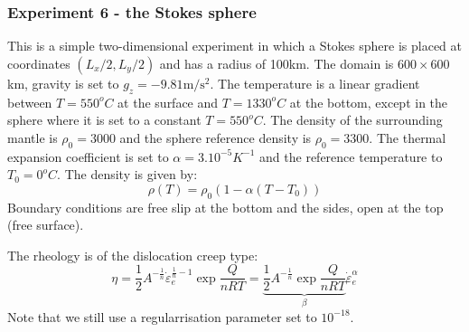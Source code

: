 \newpage
\subsubsection*{Experiment 6 - the Stokes sphere}

This is a simple two-dimensional experiment in which a Stokes sphere is placed at coordinates 
$(L_x/2,L_y/2)$ and has a radius of 100\si{\kilo\metre}. 
The domain is $600\times600$\si{\kilo\metre}, 
gravity is set to $g_z=-9.81\si{\metre\per\square\second}$.
The temperature is a linear gradient between  $T=550^oC$ at the surface and $T=1330^oC$ at the bottom,
except in the sphere where it is set to a constant $T=550^oC$.
The density of the surrounding mantle is $\rho_0=3000$ and the sphere reference density 
is $\rho_0=3300$. The thermal expansion 
coefficient is set to $\alpha=3.10^{-5} K^{-1}$ and the reference temperature to $T_0=0^oC$.
The density is given by: 
\[
\rho(T)=\rho_0(1-\alpha(T-T_0))
\]
Boundary conditions are free slip at the bottom and the sides, open at the top (free surface).

The rheology is of the dislocation creep type:
\[
\eta 
= \frac{1}{2} A^{-\frac1n} \dot\varepsilon_e^{\frac1n-1}  \exp \frac{Q}{nRT} 
= \underbrace{ \frac{1}{2} A^{-\frac1n} \exp \frac{Q}{nRT} }_{\beta} \dot\varepsilon_e^{\alpha}  
\]
Note that we still use a regularrisation parameter set to $10^{-18}$.


